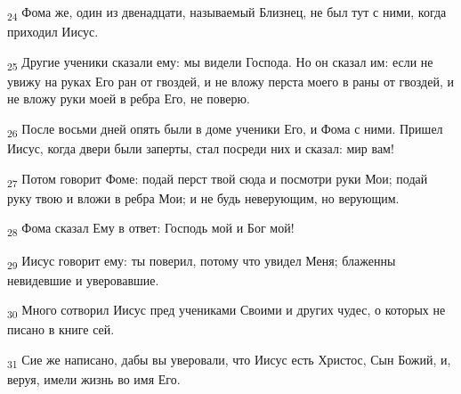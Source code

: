 \begin{tcolorbox}
\textsubscript{24} Фома же, один из двенадцати, называемый Близнец, не был тут с ними, когда приходил Иисус.
\end{tcolorbox}
\begin{tcolorbox}
\textsubscript{25} Другие ученики сказали ему: мы видели Господа. Но он сказал им: если не увижу на руках Его ран от гвоздей, и не вложу перста моего в раны от гвоздей, и не вложу руки моей в ребра Его, не поверю.
\end{tcolorbox}
\begin{tcolorbox}
\textsubscript{26} После восьми дней опять были в доме ученики Его, и Фома с ними. Пришел Иисус, когда двери были заперты, стал посреди них и сказал: мир вам!
\end{tcolorbox}
\begin{tcolorbox}
\textsubscript{27} Потом говорит Фоме: подай перст твой сюда и посмотри руки Мои; подай руку твою и вложи в ребра Мои; и не будь неверующим, но верующим.
\end{tcolorbox}
\begin{tcolorbox}
\textsubscript{28} Фома сказал Ему в ответ: Господь мой и Бог мой!
\end{tcolorbox}
\begin{tcolorbox}
\textsubscript{29} Иисус говорит ему: ты поверил, потому что увидел Меня; блаженны невидевшие и уверовавшие.
\end{tcolorbox}
\begin{tcolorbox}
\textsubscript{30} Много сотворил Иисус пред учениками Своими и других чудес, о которых не писано в книге сей.
\end{tcolorbox}
\begin{tcolorbox}
\textsubscript{31} Сие же написано, дабы вы уверовали, что Иисус есть Христос, Сын Божий, и, веруя, имели жизнь во имя Его.
\end{tcolorbox}
